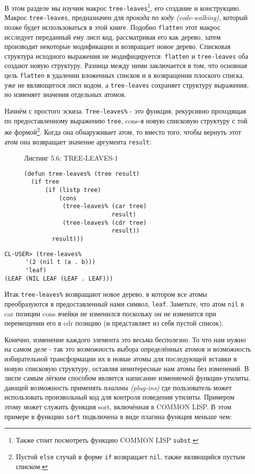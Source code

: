 В этом разделе мы изучим макрос \verb"tree-leaves"\footnote{Также стоит посмотреть функцию COMMON LISP \verb"subst".}, его создание и конструкцию. Макрос \verb"tree-leaves", предназначен для \emph{прохода по коду (code-walking)}, который позже будет использоваться в этой книге. Подобно \verb"flatten" этот макрос исследует переданный ему лисп код, рассматривая его как дерево, затем производит некоторые модификации и возвращает новое дерево. Списковая структура исходного выражения не модифицируется: \verb"flatten" и \verb"tree-leaves" оба создают новую структуру. Разница между ними заключается в том, что основная цель \verb"flatten" в удалении вложенных списков и в возвращении плоского списка, уже не являющегося лисп кодом, а \verb"tree-leaves" сохраняет структуру выражения, но изменяет значения отдельных атомов.



Начнём с простого эскиза. \verb"Tree-leaves%" - это функция, рекурсивно проходящая по предоставленному выражению \verb"tree", cons-я новую списковую структуру с той же формой\footnote{Пустой \verb"else" случай в форме \verb"if" возвращает \verb"nil", также являющийся пустым списком.}. Когда она обнаруживает атом, то вместо того, чтобы вернуть этот атом она возвращает значение аргумента \verb"result":

\begin{figure}Листинг 5.6: TREE-LEAVES-1\label{listing_5.6}
\listbegin
\begin{verbatim}
(defun tree-leaves% (tree result)
  (if tree
      (if (listp tree)
          (cons
           (tree-leaves% (car tree)
                         result)
           (tree-leaves% (cdr tree)
                         result))
        result)))
\end{verbatim}
\listend
\end{figure}

\begin{verbatim}
CL-USER> (tree-leaves%
	  '(2 (nil t (a . b)))
	  'leaf)
(LEAF (NIL LEAF (LEAF . LEAF)))
\end{verbatim}

Итак \verb"tree-leaves%" возвращают новое дерево, в котором все атомы преобразуются в предоставленный нами символ, \verb"leaf". Заметьте, что атом \verb"nil" в car позиции cons ячейки не изменился поскольку он не изменится при перемещении его в cdr позицию (и представляет из себя пустой список).

Конечно, изменение каждого элемента это весьма бесполезно. То что нам нужно на самом деле - так это возможность выбора определённых атомов и возможность избирательной трансформации их в новые атомы для последующей вставки в новую списковую структуру, оставляя неинтересные нам атомы без изменений. В лиспе самым лёгким способом является написание изменяемой функции-утилиты, дающей возможность применять \emph{плагины (plug-ins)} где пользователь может использовать произвольный код для контроля поведения утилиты. Примером этому может служить функция sort, включённая в COMMON LISP. В этом примере в функцию \verb"sort" подключена в виде плагина функция меньше чем:

